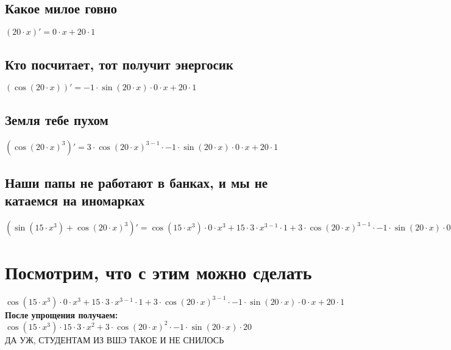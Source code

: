 \documentclass[12pt]{article}
\begin{document}
\subsection{Какое милое говно}
$(20 \cdot x)' = 0 \cdot x + 20 \cdot 1$
\subsection{Кто посчитает, тот получит энергосик}
$(\cos(20 \cdot x))' = -1 \cdot \sin(20 \cdot x) \cdot 0 \cdot x + 20 \cdot 1$
\subsection{Земля тебе пухом}
$(\cos(20 \cdot x)^{3})' = 3 \cdot \cos(20 \cdot x)^{3 - 1} \cdot -1 \cdot \sin(20 \cdot x) \cdot 0 \cdot x + 20 \cdot 1$
\subsection{Наши папы не работают в банках, и мы не катаемся на иномарках}
$(\sin(15 \cdot x^{3}) + \cos(20 \cdot x)^{3})' = \cos(15 \cdot x^{3}) \cdot 0 \cdot x^{3} + 15 \cdot 3 \cdot x^{3 - 1} \cdot 1 + 3 \cdot \cos(20 \cdot x)^{3 - 1} \cdot -1 \cdot \sin(20 \cdot x) \cdot 0 \cdot x + 20 \cdot 1$
\section{Посмотрим, что с этим можно сделать}
$\cos(15 \cdot x^{3}) \cdot 0 \cdot x^{3} + 15 \cdot 3 \cdot x^{3 - 1} \cdot 1 + 3 \cdot \cos(20 \cdot x)^{3 - 1} \cdot -1 \cdot \sin(20 \cdot x) \cdot 0 \cdot x + 20 \cdot 1$\\
\textbf{После упрощения получаем:}\\
$\cos(15 \cdot x^{3}) \cdot 15 \cdot 3 \cdot x^{2} + 3 \cdot \cos(20 \cdot x)^{2} \cdot -1 \cdot \sin(20 \cdot x) \cdot 20$\\
\LARGE ДА УЖ, СТУДЕНТАМ ИЗ ВШЭ ТАКОЕ И НЕ СНИЛОСЬ
\end{document}
